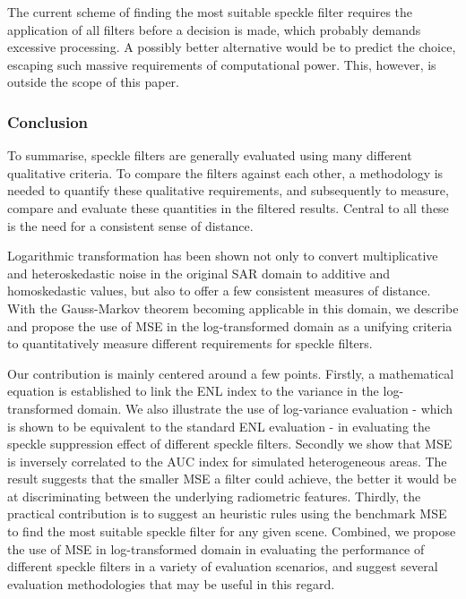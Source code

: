 The current scheme of finding the most suitable speckle filter requires the application of all filters before 
a decision is made, which probably demands excessive processing. 
A possibly better alternative would be to predict the choice, escaping such massive requirements of computational power.
This, however, is outside the scope of this paper.

\subsubsection{Conclusion}

To summarise, speckle filters are generally evaluated using many different qualitative criteria.
To compare the filters against each other, a methodology is needed
  to quantify these qualitative requirements,
  and subsequently to measure, compare and evaluate these quantities in the filtered results.
Central to all these is the need for a consistent sense of distance.

Logarithmic transformation has been shown 
  not only to convert multiplicative and heteroskedastic noise in the original SAR domain to additive and homoskedastic values,
  but also to offer a few consistent measures of distance.
With the Gauss-Markov theorem becoming applicable in this domain, we describe and propose the use of MSE in the 
log-transformed domain as a unifying criteria to quantitatively measure different requirements for speckle filters.

Our contribution is mainly centered around a few points. 
Firstly, a mathematical equation is established to link the ENL index to the variance in the log-transformed domain. 
We also illustrate the use of log-variance evaluation -
  which is shown to be equivalent to the standard ENL evaluation -
  in evaluating the speckle suppression effect of different speckle filters.
Secondly we show that MSE is inversely correlated to the AUC index for simulated heterogeneous areas.
The result suggests that the smaller MSE a filter could achieve, the better it would
be at discriminating between the underlying radiometric features.
Thirdly, the practical contribution is to suggest an heuristic rules using the benchmark MSE to find 
the most suitable speckle filter for any given scene. 
Combined, we propose the use of MSE in log-transformed domain in evaluating the performance of different speckle filters in a variety of evaluation scenarios, and suggest several evaluation methodologies that may be useful in this regard.

